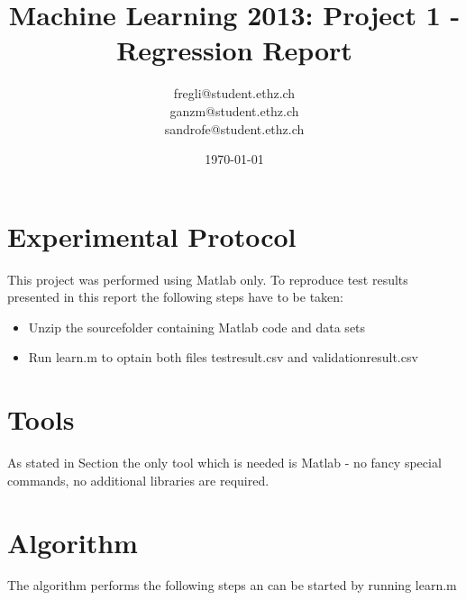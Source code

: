 \documentclass[a4paper, 11pt]{article}
\title{Machine Learning 2013: Project 1 - Regression Report}
\author{fregli@student.ethz.ch\\ ganzm@student.ethz.ch\\ sandrofe@student.ethz.ch\\}
\date{\today}
\begin{document}
\maketitle

\section*{Experimental Protocol}
\label{sec:exp-protocl}

This project was performed using Matlab only. To reproduce test results presented in this report the following steps have to be taken:

\begin{itemize}
\item Unzip the sourcefolder containing Matlab code and data sets
\item Run learn.m to optain both files testresult.csv and validationresult.csv
\end{itemize}

\section{Tools}

As stated in Section  the only tool which is needed is Matlab - no fancy special commands, no additional libraries are required.

\section{Algorithm}

The algorithm performs the following steps an can be started by running learn.m
\end{document}
